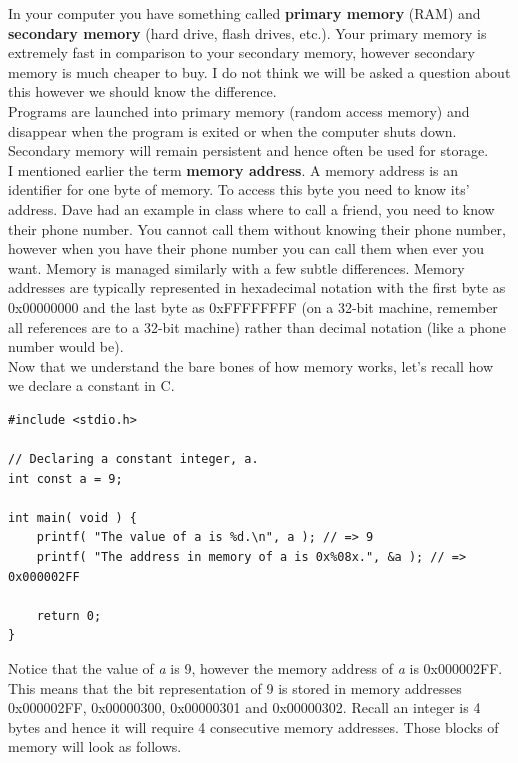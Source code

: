 \documentclass[12pt,extarticle]{article}
\begin{document}
In your computer you have something called \textbf{primary memory} (RAM) and \textbf{secondary memory} (hard drive, flash drives, etc.). Your primary memory is extremely fast in comparison to your secondary memory, however secondary memory is much cheaper to buy. I do not think we will be asked a question about this however we should know the difference.\\

Programs are launched into primary memory (random access memory) and disappear when the program is exited or when the computer shuts down. Secondary memory will remain persistent and hence often be used for storage.\\

I mentioned earlier the term \textbf{memory address}. A memory address is an identifier for one byte of memory. To access this byte you need to know its' address. Dave had an example in class where to call a friend, you need to know their phone number. You cannot call them without knowing their phone number, however when you have their phone number you can call them when ever you want. Memory is managed similarly with a few subtle differences. Memory addresses are typically represented in hexadecimal notation with the first byte as 0x00000000 and the last byte as 0xFFFFFFFF (on a 32-bit machine, remember all references are to a 32-bit machine) rather than decimal notation (like a phone number would be).\\

Now that we understand the bare bones of how memory works, let's recall how we declare a constant in C.\\

\lstset {
	language=c
}
\begin{lstlisting}
#include <stdio.h>

// Declaring a constant integer, a.
int const a = 9;

int main( void ) {
	printf( "The value of a is %d.\n", a ); // => 9
	printf( "The address in memory of a is 0x%08x.", &a ); // => 0x000002FF
	
	return 0;
}
\end{lstlisting}

Notice that the value of \emph{a} is 9, however the memory address of \emph{a} is 0x000002FF. This means that the bit representation of 9 is stored in memory addresses 0x000002FF, 0x00000300, 0x00000301 and 0x00000302. Recall an integer is 4 bytes and hence it will require 4 consecutive memory addresses. Those blocks of memory will look as follows.
\end{document}
